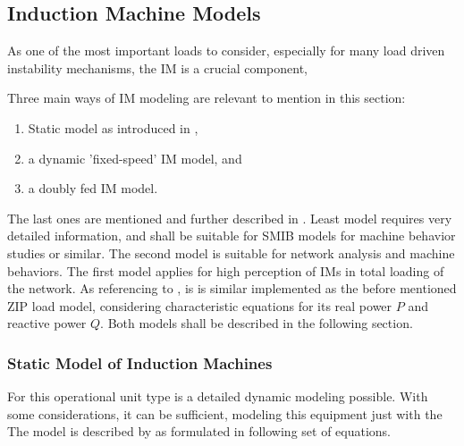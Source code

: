 \subsection{Induction Machine Models}

As one of the most important loads to consider, especially for many load driven instability mechanisms, the \ac{IM} is a crucial component, \quelle


Three main ways of \acs{IM} modeling are relevant to mention in this section:
\begin{enumerate}
        \item Static model as introduced in \textcite{IEEEGuideLoad2022},
        \item a dynamic 'fixed-speed' \acs{IM} model, and
        \item a doubly fed \acs{IM} model.
\end{enumerate} 
The last ones are mentioned and further described in \textcite{machowskiPowerSystemDynamics2020}. Least model requires very detailed information, and shall be suitable for \acs{SMIB} models for machine behavior studies or similar. The second model is suitable for network analysis and machine behaviors. The first model applies for high perception of \acsp{IM} in total loading of the network. As referencing to \textcite{IEEEGuideLoad2022}, is is similar implemented as the before mentioned ZIP load model, considering characteristic equations for its real power $P$ and reactive power $Q$. Both models shall be described in the following section.

\subsubsection{Static Model of Induction Machines}

For this operational unit type is a detailed dynamic modeling possible. With some considerations, it can be sufficient, modeling this equipment just with the  The model is described by \textcite{IEEEGuideLoad2022} as formulated in following set of equations. %

